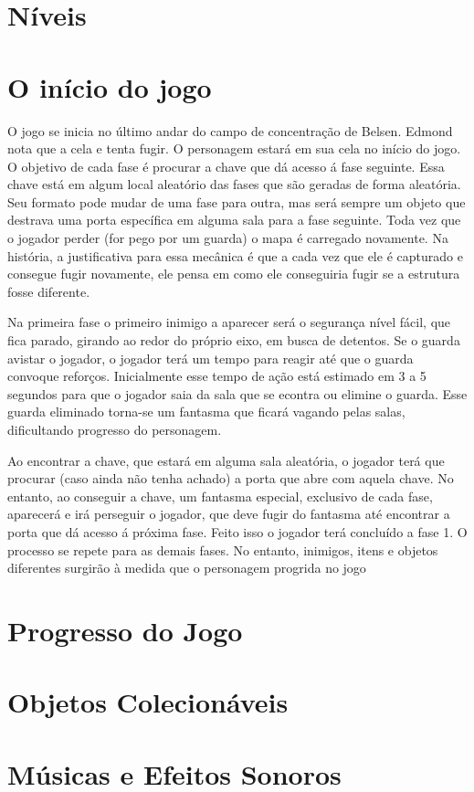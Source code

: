 \documentclass{article}
\begin{document}
\section{Níveis}

\section{O início do jogo}
    O jogo se inicia no último andar do campo de concentração de Belsen. Edmond nota que a cela e tenta fugir. O personagem estará em sua cela no início do jogo. O objetivo de cada fase é procurar a chave que dá acesso á fase seguinte. Essa chave está em algum local aleatório das fases que são geradas de forma aleatória. Seu formato pode mudar de uma fase para outra, mas será sempre um objeto que destrava uma porta específica em alguma sala para a fase seguinte. Toda vez que o jogador perder (for pego por um guarda) o mapa é carregado novamente. Na história, a justificativa para essa mecânica é que a cada vez que ele é capturado e consegue fugir novamente, ele pensa em como ele conseguiria fugir se a estrutura fosse diferente.
  
    Na primeira fase o primeiro inimigo a aparecer será o segurança nível fácil, que fica parado, girando ao redor do próprio eixo, em busca de detentos. Se o guarda avistar o jogador, o jogador terá um tempo para reagir até que o guarda convoque reforços. Inicialmente esse tempo de ação está estimado em 3 a 5 segundos para que o jogador saia da sala que se econtra ou elimine o guarda. Esse guarda eliminado torna-se um fantasma que ficará vagando pelas salas, dificultando progresso do personagem.
  
    Ao encontrar a chave, que estará em alguma sala aleatória, o jogador terá que procurar (caso ainda não tenha achado) a porta que abre com aquela chave. No entanto, ao conseguir a chave, um fantasma especial, exclusivo de cada fase, aparecerá e irá perseguir o jogador, que deve fugir do fantasma até encontrar a porta que dá acesso á próxima fase. Feito isso o jogador terá concluído a fase 1. O processo se repete para as demais fases. No entanto, inimigos, itens e objetos diferentes surgirão à medida que o personagem progrida no jogo

\section{Progresso do Jogo}
\section{Objetos Colecionáveis}
\section{Músicas e Efeitos Sonoros}
\end{document}
